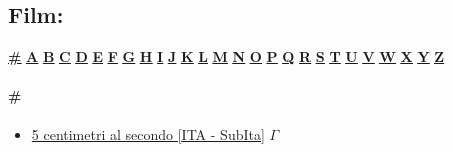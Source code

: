 \subsection [Film]{\huge Film:}
		\begin{center}
			\hyperlink{F\#}{\textbf{\underline{\#}}}
			\hyperlink{FA}{\textbf{\underline{A}}} \hyperlink{FB}{\textbf{\underline{B}}} \hyperlink{FC}{\textbf{\underline{C}}} \hyperlink{FD}{\textbf{\underline{D}}} \hyperlink{FE}{\textbf{\underline{E}}} \hyperlink{FF}{\textbf{\underline{F}}} \hyperlink{FG}{\textbf{\underline{G}}} \hyperlink{FH}{\textbf{\underline{H}}} \hyperlink{FI}{\textbf{\underline{I}}} \hyperlink{FJ}{\textbf{\underline{J}}} \hyperlink{FK}{\textbf{\underline{K}}} \hyperlink{FL}{\textbf{\underline{L}}} \hyperlink{FM}{\textbf{\underline{M}}} \hyperlink{FN}{\textbf{\underline{N}}} \hyperlink{FO}{\textbf{\underline{O}}} \hyperlink{FP}{\textbf{\underline{P}}} \hyperlink{FQ}{\textbf{\underline{Q}}} \hyperlink{FR}{\textbf{\underline{R}}} \hyperlink{FS}{\textbf{\underline{S}}} \hyperlink{FT}{\textbf{\underline{T}}} \hyperlink{FU}{\textbf{\underline{U}}} \hyperlink{FV}{\textbf{\underline{V}}} \hyperlink{FW}{\textbf{\underline{W}}} \hyperlink{FX}{\textbf{\underline{X}}} \hyperlink{FY}{\textbf{\underline{Y}}} \hyperlink{FZ}{\textbf{\underline{Z}}}
		\end{center}	
		
		\paragraph{\#} \hypertarget{F\#}{}
			\begin{itemize}
				
				\item \href{https://mega.nz/#!k6RTlLwL!pqjPObzOH7tNY9aJrc-ZPNXzgNy1525KiWzclGoTepQ} {5 centimetri al secondo [ITA - SubIta]}  $\varGamma$   \\
				
				
			\end{itemize}
		
			
